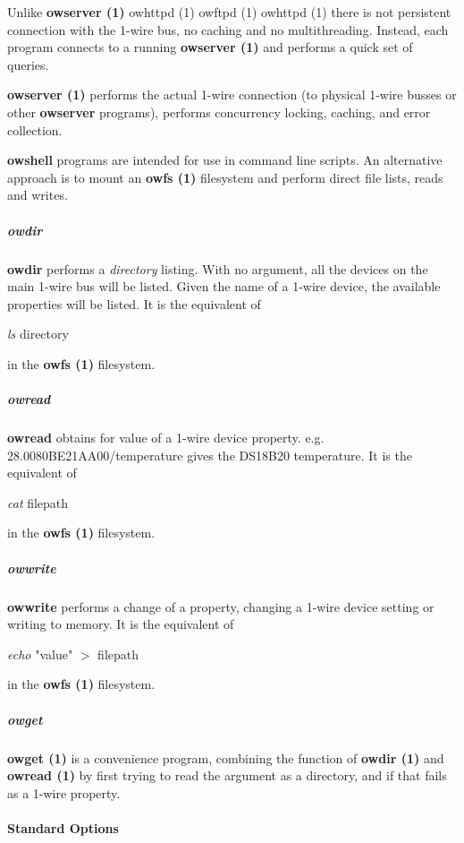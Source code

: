 Unlike \textsf{\textbf{owserver (1)} \textsf{owhttpd (1)} \textsf{owftpd (1)}
\textsf{owhttpd (1)}} there is not persistent connection with the 1-wire bus, no caching
and no multithreading. Instead, each program connects to a running \textsf{\textbf{owserver
(1)}} and performs a quick set of queries. 

\textsf{\textbf{owserver (1)}} performs the actual
1-wire connection (to physical 1-wire busses or other \textbf{owserver} programs),
performs concurrency locking, caching, and error collection. 

\textbf{owshell} programs
are intended for use in command line scripts. An alternative approach is
to mount an \textsf{\textbf{owfs (1)}} filesystem and perform direct file lists, reads and
writes. 
\subparagraph*{owdir}\textbf{owdir} performs a \textit{directory} listing. With no argument, all the
devices on the main 1-wire bus will be listed. Given the name of a 1-wire
device, the available properties will be listed. It is the equivalent of
\begin{description}
\item [\textit{ls} directory ] 
\end{description}


in the \textsf{\textbf{owfs (1)}} filesystem. 
\subparagraph*{owread}\textbf{owread} obtains for value
of a 1-wire device property. e.g. 28.0080BE21AA00/temperature gives the DS18B20
temperature. It is the equivalent of \begin{description}
\item [\textit{cat} filepath ] 
\end{description}


in the \textsf{\textbf{owfs (1)}} filesystem.

\subparagraph*{owwrite}\textbf{owwrite} performs a change of a property, changing a 1-wire device
setting or writing to memory. It is the equivalent of \begin{description}
\item [\textit{echo} "value" $>$ filepath
] 
\end{description}


in the \textsf{\textbf{owfs (1)}} filesystem. 
\subparagraph*{owget}\textsf{\textbf{owget (1)}} is a convenience program, combining
the function of \textsf{\textbf{owdir (1)}} and \textsf{\textbf{owread (1)}} by first trying to read the argument
as a directory, and if that fails as a 1-wire property. 
\paragraph*{Standard Options}

